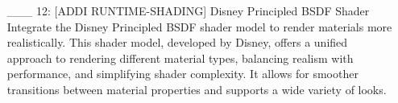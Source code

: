 \documentclass {article}
\begin{document}
\begin{enumerate}
     \item[\_\_\_ 12:]  [ADDI RUNTIME-SHADING] Disney Principled BSDF Shader
     \\ Integrate the Disney Principled BSDF shader model to render materials more realistically. This shader model, developed by 
     Disney, offers a unified approach to rendering different material types, balancing realism with performance, and simplifying 
     shader complexity. It allows for smoother transitions between material properties and supports a wide variety of looks.
 
\end{enumerate}
 
\printbibliography

\end{document}
